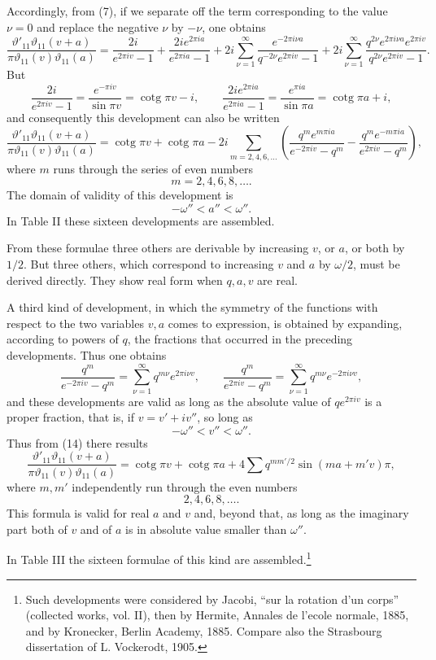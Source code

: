 \documentclass[11pt]{article}
\newcommand{\tht}{\vartheta}
\newcommand{\cotg}{\operatorname{cotg}}
\begin{document}
Accordingly, from (7), if we separate off the term corresponding to the value $\nu=0$ and replace the negative $\nu$ by $-\nu$, one obtains
\[
\frac{\tht'_{11}\tht_{11}(v+a)}{\pi\tht_{11}(v)\tht_{11}(a)}
=\frac{2i}{e^{2\pi iv}-1}+\frac{2ie^{2\pi ia}}{e^{2\pi ia}-1}
+2i\sum_{\nu=1}^{\infty}\frac{e^{-2\pi i\nu a}}{q^{-2\nu}e^{2\pi iv}-1}
+2i\sum_{\nu=1}^{\infty}\frac{q^{2\nu}e^{2\pi i\nu a}e^{2\pi iv}}{q^{2\nu}e^{2\pi iv}-1}.
\]
But
\[
\frac{2i}{e^{2\pi iv}-1}=\frac{e^{-\pi iv}}{\sin\pi v}=\cotg\pi v-i,
\qquad
\frac{2ie^{2\pi ia}}{e^{2\pi ia}-1}=\frac{e^{\pi ia}}{\sin\pi a}=\cotg\pi a+i,
\]
and consequently this development can also be written
\begin{equation}
\frac{\tht'_{11}\tht_{11}(v+a)}{\pi\tht_{11}(v)\tht_{11}(a)}
=\cotg\pi v+\cotg\pi a
-2i\sum_{m=2,4,6,\ldots}\left(
\frac{q^m e^{m\pi ia}}{e^{-2\pi iv}-q^m}
-\frac{q^m e^{-m\pi ia}}{e^{2\pi iv}-q^m}
\right),
\tag{14}
\end{equation}
where $m$ runs through the series of even numbers
\[
m=2,4,6,8,\ldots.
\]
The domain of validity of this development is
\[
-\omega''<a''<\omega''.
\]
In Table II these sixteen developments are assembled.

From these formulae three others are derivable by increasing $v$, or $a$, or both by $1/2$. But three others, which correspond to increasing $v$ and $a$ by $\omega/2$, must be derived directly. They show real form when $q,a,v$ are real.

A third kind of development, in which the symmetry of the functions with respect to the two variables $v,a$ comes to expression, is obtained by expanding, according to powers of $q$, the fractions that occurred in the preceding developments. Thus one obtains
\[
\frac{q^m}{e^{-2\pi iv}-q^m}=\sum_{\nu=1}^{\infty}q^{m\nu}e^{2\pi i\nu v},
\qquad
\frac{q^m}{e^{2\pi iv}-q^m}=\sum_{\nu=1}^{\infty}q^{m\nu}e^{-2\pi i\nu v},
\]
and these developments are valid as long as the absolute value of $qe^{2\pi iv}$ is a proper fraction, that is, if $v=v'+iv''$, so long as
\[
-\omega''<v''<\omega''.
\]
Thus from (14) there results
\[
\frac{\tht'_{11}\tht_{11}(v+a)}{\pi\tht_{11}(v)\tht_{11}(a)}
=\cotg\pi v+\cotg\pi a+4\sum q^{mm'/2}\sin(m a+m'v)\pi,
\]
where $m,m'$ independently run through the even numbers
\[
2,4,6,8,\ldots.
\]
This formula is valid for real $a$ and $v$ and, beyond that, as long as the imaginary part both of $v$ and of $a$ is in absolute value smaller than $\omega''$.

In Table III the sixteen formulae of this kind are assembled.\footnote{Such developments were considered by Jacobi, ``sur la rotation d'un corps'' (collected works, vol. II), then by Hermite, Annales de l'ecole normale, 1885, and by Kronecker, Berlin Academy, 1885. Compare also the Strasbourg dissertation of L. Vockerodt, 1905.}
\end{document}
